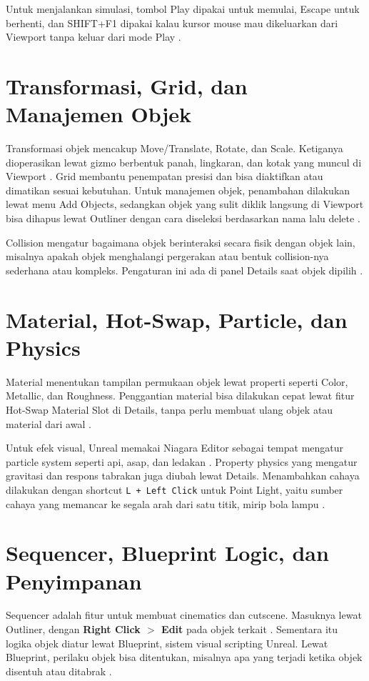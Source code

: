 \documentclass[a4paper,oneside,12pt]{report}
\begin{document}
Untuk menjalankan simulasi, tombol Play dipakai untuk memulai, Escape untuk berhenti, dan SHIFT+F1 dipakai kalau kursor mouse mau dikeluarkan dari Viewport tanpa keluar dari mode Play \cite{modul2}.

\section{Transformasi, Grid, dan Manajemen Objek}
Transformasi objek mencakup Move/Translate, Rotate, dan Scale. Ketiganya dioperasikan lewat gizmo berbentuk panah, lingkaran, dan kotak yang muncul di Viewport \cite{modul2}. Grid membantu penempatan presisi dan bisa diaktifkan atau dimatikan sesuai kebutuhan. Untuk manajemen objek, penambahan dilakukan lewat menu Add Objects, sedangkan objek yang sulit diklik langsung di Viewport bisa dihapus lewat Outliner dengan cara diseleksi berdasarkan nama lalu delete \cite{modul2}.

Collision mengatur bagaimana objek berinteraksi secara fisik dengan objek lain, misalnya apakah objek menghalangi pergerakan atau bentuk collision-nya sederhana atau kompleks. Pengaturan ini ada di panel Details saat objek dipilih \cite{modul2}.

\section{Material, Hot-Swap, Particle, dan Physics}
Material menentukan tampilan permukaan objek lewat properti seperti Color, Metallic, dan Roughness. Penggantian material bisa dilakukan cepat lewat fitur Hot-Swap Material Slot di Details, tanpa perlu membuat ulang objek atau material dari awal \cite{modul2}.

Untuk efek visual, Unreal memakai Niagara Editor sebagai tempat mengatur particle system seperti api, asap, dan ledakan \cite{modul2}. Property physics yang mengatur gravitasi dan respons tabrakan juga diubah lewat Details. Menambahkan cahaya dilakukan dengan shortcut \texttt{L + Left Click} untuk Point Light, yaitu sumber cahaya yang memancar ke segala arah dari satu titik, mirip bola lampu \cite{modul2}.

\section{Sequencer, Blueprint Logic, dan Penyimpanan}
Sequencer adalah fitur untuk membuat cinematics dan cutscene. Masuknya lewat Outliner, dengan \textbf{Right Click $>$ Edit} pada objek terkait \cite{modul2}. Sementara itu logika objek diatur lewat Blueprint, sistem visual scripting Unreal. Lewat Blueprint, perilaku objek bisa ditentukan, misalnya apa yang terjadi ketika objek disentuh atau ditabrak \cite{modul2}.
\end{document}
